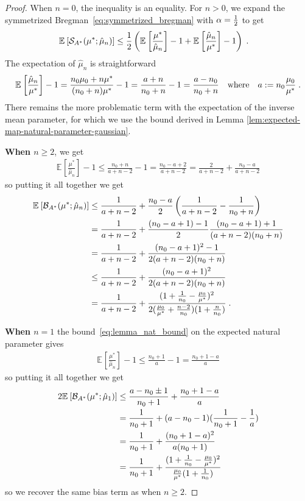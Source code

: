 \documentclass[twoside]{article}
\newcommand*{\expect}[2][]{\ensuremath{\mathbb{E}_{#1} \left[ #2 \right] }} %
\newcommand{\logpart}{A}
\newcommand{\conj}{{\logpart^*}}
\newcommand{\bregmanconj}{\cB_{\logpart^*}}
\newcommand{\m}{\mu}
\newcommand{\MAPm}{\hat \m_n}
\begin{document}
\begin{proof}
When $n=0$, the inequality is an equality. 
For $n>0$, we expand the symmetrized Bregman~\eqref{eq:symmetrized_bregman} with $\alpha=\frac{1}{2}$ to get
\begin{align}
	\expect{\cS_\conj(\mu^*; \MAPm)} 
	&\leq \half \paren{\expect{\frac{\mu^*}{\MAPm}} -1  + \expect{\frac{\MAPm}{\mu^*}} - 1} \; .
\end{align}
The expectation of $\MAPm$ is straightforward
\begin{align}
	 \expect{\frac{\MAPm}{\mu^*}} - 1 
	 = \frac{n_0 \mu_0 + n \mu^*}{(n_0+n)\mu^*} - 1 
	 = \frac{a+n}{n_0+n} - 1 = \frac{a - n_0}{n_0+n}
	 \quadtext{where}
	 a:=n_0\frac{\mu_0}{\mu^*} \; .
\end{align}
There remains the more problematic term with the expectation of the inverse mean parameter, 
for which we use the bound derived in Lemma \ref{lem:expected-map-natural-parameter-gaussian}.

\textbf{When $n\geq 2$}, we get 
\begin{align}
	\expect{\frac{\mu^*}{\MAPm}} - 1 
	\leq \frac{n_0 + n}{a +n - 2} -1
	= \frac{n_0 - a + 2}{a +n - 2}
	 = \frac{2}{a +n - 2} + \frac{n_0 - a}{a +n - 2}
\end{align}
so putting it all together we get 
\begin{align}
	\expect{\bregmanconj(\mu^*; \MAPm)} 
	&\leq \frac{1}{a+n-2} + \frac{n_0-a}{2}  \left( \inv{a+n-2} - \inv{n_0+n} \right)\\
	&= \frac{1}{a+n-2} + \frac{(n_0-a + 1) - 1}{2}  \frac{(n_0 - a + 1) + 1}{(a+n-2)(n_0+n)} \\
	&= \frac{1}{a+n-2} + \frac{(n_0 - a +1)^2 - 1}{2(a+n-2)(n_0+n)} \\
	&\leq \frac{1}{a+n-2} + \frac{(n_0 - a +1)^2}{2(a+n-2)(n_0 + n)} \\
	&= \frac{1}{a+n-2} + \frac{(1 + \inv{n_0} - \frac{\mu_0}{\mu^*})^2}{2 (\frac{\mu_0}{\mu^*}+\frac{n-2}{n_0})(1 + \frac{n}{n_0} )} \; .
\end{align}

\textbf{When $n=1$} the bound~\eqref{eq:lemma_nat_bound}  on the expected natural parameter gives
\begin{align}
	\expect{\frac{\mu^*}{\MAPm}} - 1 
	\leq \frac{n_0 + 1}{a} -1
	= \frac{n_0 +1 - a}{a}
\end{align}
so putting it all together we get
\begin{align}
	2\expect{\bregmanconj(\mu^*; \hat \mu_1)} 
	&\leq \frac{a - n_0 \pm 1}{n_0 + 1}  + \frac{n_0 +1 - a }{a} \\
	& = \inv{n_0+1}  + ( a - n_0 - 1)(\inv{n_0+1} - \inv{a}) \\
	& = \inv{n_0+1}  + \frac{(n_0 + 1 -a)^2}{a(n_0+1)}\\
	&= \inv{n_0+1}  + \frac{(1 + \inv{n_0} - \frac{\mu_0}{\mu^*})^2}{\frac{\mu_0}{\mu^*}(1 + \inv{n_0} )} 
\end{align}
so we  recover the same bias term as when $n\geq2$.
\end{proof}
\end{document}
